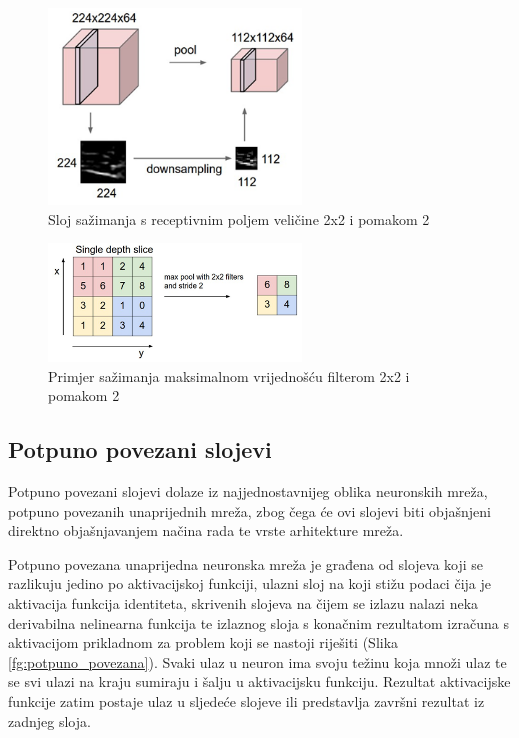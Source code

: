 \documentclass[times, utf8, proizvoljni, numeric]{fer}
\begin{document}
\begin{figure}[H]
	\begin{center}
		\captionsetup{justification=centering}
		\includegraphics[width=0.6\textwidth]{./imgs/sazimanje.png}
		\caption{Sloj sažimanja s receptivnim poljem veličine 2x2 i pomakom 2 \cite{CS231n}}
		\label{fg:sazimanje}
	\end{center}
\end{figure}


\begin{figure}[H]
	\begin{center}
		\captionsetup{justification=centering}
		\includegraphics[width=0.6\textwidth]{./imgs/sazimanje2.png}
		\caption{Primjer sažimanja maksimalnom vrijednošću filterom 2x2 i pomakom 2 \cite{CS231n}}
		\label{fg:sazimanje2}
	\end{center}
\end{figure}

\subsection{Potpuno povezani slojevi}

Potpuno povezani slojevi dolaze iz najjednostavnijeg oblika neuronskih mreža, potpuno povezanih unaprijednih mreža, zbog čega će ovi slojevi biti objašnjeni direktno objašnjavanjem načina rada te vrste arhitekture mreža.
 
Potpuno povezana unaprijedna neuronska mreža je građena od slojeva koji se razlikuju jedino po aktivacijskoj funkciji, ulazni sloj na koji stižu podaci čija je aktivacija funkcija identiteta, skrivenih slojeva na čijem se izlazu nalazi neka derivabilna nelinearna funkcija te izlaznog sloja s konačnim rezultatom izračuna s aktivacijom prikladnom za problem koji se nastoji riješiti (Slika \ref{fg:potpuno_povezana}). Svaki ulaz u neuron ima svoju težinu koja množi ulaz te se svi ulazi na kraju sumiraju i šalju u aktivacijsku funkciju. Rezultat aktivacijske funkcije zatim postaje ulaz u sljedeće slojeve ili predstavlja završni rezultat iz zadnjeg sloja.
\end{document}
